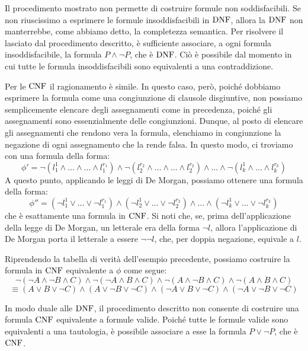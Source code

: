 \begin{note}{}
  Il procedimento mostrato non permette di costruire formule non soddisfacibili. Se non riuscissimo a esprimere le formule insoddisfacibili in \(\operatorname{DNF}\), allora la \(\operatorname{DNF}\) non manterrebbe, come abbiamo detto, la completezza semantica.
  Per risolvere il  lasciato dal procedimento descritto, è sufficiente associare, a ogni formula insoddisfacibile, la formula \(P\land \neg P\), che è \(\operatorname{DNF}\).
  Ciò è possibile dal momento in cui tutte le formula insoddisfacibili sono equivalenti a una contraddizione.
\end{note}

Per le \(\operatorname{CNF}\) il ragionamento è simile. 
In questo caso, però, poiché dobbiamo esprimere la formula come una congiunzione di clausole disgiuntive, non possiamo semplicemente elencare degli assegnamenti come in precedenza, poiché gli assegnamenti sono essenzialmente delle congiunzioni.
Dunque, al posto di elencare gli assegnamenti che rendono vera la formula, elenchiamo in congiunzione la negazione di ogni assegnamento che la rende falsa. 
In questo modo, ci troviamo con una formula della forma:
\[\phi' = \neg(l_1^1 \land \ldots \land \ldots \land l_1^{r_1})\land\neg(l_2^{r_2}\land \ldots \land \ldots\land l_2^{r_2})\land\ldots\land \neg(l_k^1\land\ldots\land l_k^{r_k})\]
A questo punto, applicando le leggi di De Morgan, possiamo ottenere una formula della forma:
\[\phi'' = (\neg l_1^1 \lor \ldots \lor \neg l_1^{r_1})\land(\neg l_2^1 \lor \ldots \lor \neg l_2^{r_2})\land\ldots\land (\neg l_k^1 \lor \ldots \lor \neg l_k^{r_k})\]
che è esattamente una formula in \(\operatorname{CNF}\).
Si noti che, se, prima dell'applicazione della legge di De Morgan, un letterale era della forma \(\neg l\), allora l'applicazione di De Morgan porta il letterale a essere \(\neg \neg l\), che, per doppia negazione, equivale a \(l\).

\begin{example}{}
  Riprendendo la tabella di verità dell'esempio precedente, possiamo costruire la formula in \(\operatorname{CNF}\) equivalente a \(\phi\) come segue:
  \[\neg(\neg A \land \neg B \land C) \land \neg(\neg A \land B \land C) \land \neg(A \land \neg B \land C) \land \neg(A \land B \land C)\]
  \[\equiv (A \lor B \lor \neg C) \land (A \lor \neg B \lor \neg C) \land (\neg A \lor B \lor \neg C) \land (\neg A \lor \neg B \lor \neg C)\]
\end{example}

\begin{note}{}
  In modo duale alle \(\operatorname{DNF}\), il procedimento descritto non consente di costruire una formula \(\operatorname{CNF}\) equivalente a formule valide.
  Poiché tutte le formule valide sono equivalenti a una tautologia, è possibile associare a esse la formula \(P \lor \neg P\), che è \(\operatorname{CNF}\).
\end{note}


